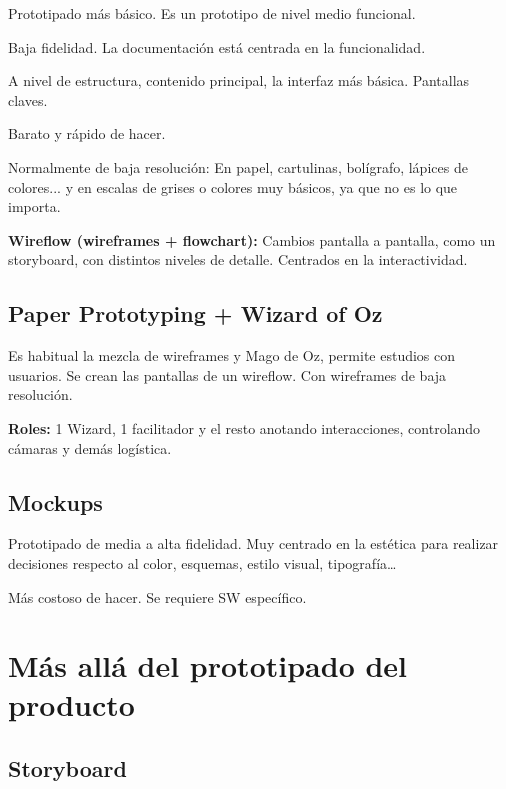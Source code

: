 \documentclass[12pt]{report} %
\begin{document}
Prototipado más básico. Es un prototipo de nivel medio funcional.

Baja fidelidad. La documentación está centrada en la funcionalidad.

A nivel de estructura, contenido principal, la interfaz más básica.
Pantallas claves.

Barato y rápido de hacer.

Normalmente de baja resolución: En papel, cartulinas, bolígrafo, lápices de colores... y en escalas de grises o colores muy básicos, ya que no es lo que importa.

\textbf{Wireflow (wireframes + flowchart):} Cambios pantalla a pantalla, como un storyboard, con distintos niveles de detalle. Centrados en la interactividad.

\subsection{Paper Prototyping + Wizard of Oz}

Es habitual la mezcla de wireframes y Mago de Oz, permite estudios con usuarios.
Se crean las pantallas de un wireflow. Con wireframes de baja resolución.

\textbf{Roles:} 1 Wizard, 1 facilitador y el resto anotando interacciones, controlando cámaras y demás logística.

\subsection{Mockups}
Prototipado de media a alta fidelidad. Muy centrado en la estética para realizar decisiones respecto al color, esquemas, estilo visual, tipografía…

Más costoso de hacer. Se requiere SW específico.

\section{Más allá del prototipado del producto}
\subsection{Storyboard}
\end{document}
